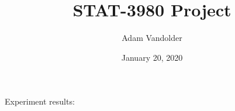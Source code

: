 \documentclass{article}
\title{STAT-3980 Project}
\author{Adam Vandolder}
\date{January 20, 2020}
\begin{document}
    \maketitle

    Experiment results:
\end{document}
